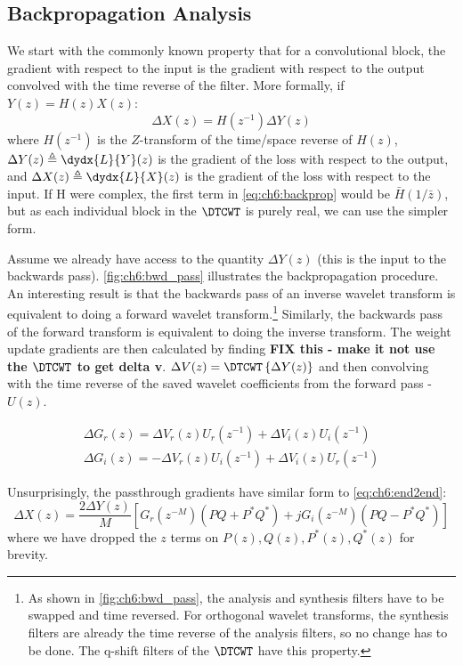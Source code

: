 \subsection{Backpropagation Analysis}
We start with the commonly known property that for a convolutional block, the
gradient with respect to the input is the gradient with respect to the output
convolved with the time reverse of the filter. More formally, if 
$Y(z) = H(z) X(z)$:
%
\begin{equation}\label{eq:ch6:backprop}
  \Delta X(z) = H(z^{-1}) \Delta Y(z)
\end{equation}
%
where $H(z^{-1})$ is the $Z$-transform of the time/space reverse of $H(z)$,
$\Delta Y(z) \triangleq \dydx{L}{Y}(z)$ is the gradient of the loss with respect
to the output, and $\Delta X(z) \triangleq \dydx{L}{X}(z)$ is the gradient of
the loss with respect to the input. If H were complex, the first term in
\autoref{eq:ch6:backprop} would be $\bar{H}(1/\bar{z})$, but as each individual
block in the $\DTCWT$ is purely real, we can use the simpler form. 

Assume we already have access to the quantity $\Delta Y(z)$ (this is the input
to the backwards pass). \autoref{fig:ch6:bwd_pass} illustrates the
backpropagation procedure. An interesting result is that the backwards pass of
an inverse wavelet transform is equivalent to doing a forward wavelet
transform.\footnote{As shown in \autoref{fig:ch6:bwd_pass}, the analysis and
synthesis filters have to be swapped and time reversed. For orthogonal wavelet
transforms, the synthesis filters are already the time reverse of the analysis
filters, so no change has to be done. The q-shift filters of the $\DTCWT$
\cite{kingsbury_design_2003} have this property.} Similarly, the backwards pass
of the forward transform is equivalent to doing the inverse transform. The
weight update gradients are then calculated by finding 
\textbf{FIX this - make it not use the $\DTCWT$ to get delta v}.
$\Delta V(z) = \DTCWT\left\{ \Delta Y(z) \right\}$ and then convolving with the 
time reverse of the saved wavelet coefficients from the forward pass - $U(z)$.

\begin{gather}
  \Delta G_r(z) = \Delta V_r(z) U_r(z^{-1}) + \Delta V_i(z) U_i(z^{-1})  \label{eq:ch6:gr_update}\\
  \Delta G_i(z) =  -\Delta V_r(z) U_i(z^{-1}) + \Delta V_i(z) U_r(z^{-1})  \label{eq:ch6:gi_update} 
\end{gather}

Unsurprisingly, the passthrough gradients have similar form to
\autoref{eq:ch6:end2end}:
\begin{equation}\label{eq:ch6:passthrough}
    \Delta X(z) = \frac{2\Delta Y(z)}{M} \left[G_r(z^{-M})\left( PQ + P^*Q^* \right)\right. + 
      \left. jG_i(z^{-M}) \left(PQ-P^*Q^* \right) \right] 
\end{equation}
where we have dropped the $z$ terms on $P(z), Q(z), P^*(z), Q^*(z)$ for brevity.

